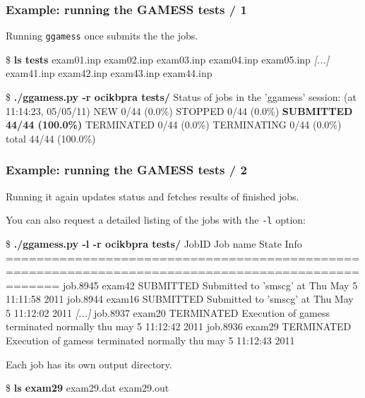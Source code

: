 \documentclass {beamer}
\newcommand{\largeskip}{\vspace{1em}}
\def\+{\largeskip}
\begin{document}
\begin{frame}[fragile]
  \frametitle{Example: running the GAMESS tests / 1}
  Running \texttt{ggamess} once submits the the jobs.

  \begin{scriptsize}
\begin{semiverbatim}
\$ \textbf{ls tests}
exam01.inp  exam02.inp  exam03.inp  exam04.inp  exam05.inp
\emph{[...]}
exam41.inp  exam42.inp  exam43.inp  exam44.inp 

\$ \textbf{./ggamess.py -r ocikbpra tests/}
Status of jobs in the 'ggamess' session: (at 11:14:23, 05/05/11)
        NEW   0/44     (0.0\%)
    STOPPED   0/44     (0.0\%)
  \textbf{SUBMITTED   44/44   (100.0\%)}
 TERMINATED   0/44     (0.0\%)
TERMINATING   0/44     (0.0\%)
      total   44/44   (100.0\%)
\end{semiverbatim}
  \end{scriptsize}
\end{frame}

\begin{frame}[fragile]
  \frametitle{Example: running the GAMESS tests / 2}
  Running it again updates status and fetches results of finished jobs.

  \+
  You can also request a detailed listing of the jobs with the
  \texttt{-l} option:
  \begin{scriptsize}
  \begin{semiverbatim}
\$ \textbf{./ggamess.py -l -r ocikbpra tests/}
 JobID     Job name     State                                    Info                               
===================================================================================================
job.8945   exam42     SUBMITTED    Submitted to 'smscg' at Thu May  5 11:11:58 2011                 
job.8944   exam16     SUBMITTED    Submitted to 'smscg' at Thu May  5 11:12:02 2011                 
\emph{[...]}
job.8937   exam20     TERMINATED   Execution of gamess terminated normally thu may  5 11:12:42 2011
job.8936   exam29     TERMINATED   Execution of gamess terminated normally thu may  5 11:12:43 2011
\end{semiverbatim}
  \end{scriptsize}

  Each job has its own output directory.
  \begin{scriptsize}
\begin{semiverbatim}
\$ \textbf{ls exam29}
exam29.dat  exam29.out
\end{semiverbatim}
  \end{scriptsize}
\end{frame}
\end{document}
